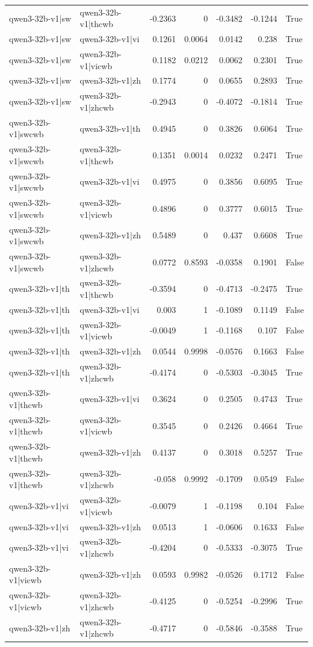 \begin{table}
\begin{tabular}{l l r r r r l}
qwen3-32b-v1|sw & qwen3-32b-v1|thcwb & -0.2363 & 0 & -0.3482 & -0.1244 & True \\
qwen3-32b-v1|sw & qwen3-32b-v1|vi & 0.1261 & 0.0064 & 0.0142 & 0.238 & True \\
qwen3-32b-v1|sw & qwen3-32b-v1|vicwb & 0.1182 & 0.0212 & 0.0062 & 0.2301 & True \\
qwen3-32b-v1|sw & qwen3-32b-v1|zh & 0.1774 & 0 & 0.0655 & 0.2893 & True \\
qwen3-32b-v1|sw & qwen3-32b-v1|zhcwb & -0.2943 & 0 & -0.4072 & -0.1814 & True \\
qwen3-32b-v1|swcwb & qwen3-32b-v1|th & 0.4945 & 0 & 0.3826 & 0.6064 & True \\
qwen3-32b-v1|swcwb & qwen3-32b-v1|thcwb & 0.1351 & 0.0014 & 0.0232 & 0.2471 & True \\
qwen3-32b-v1|swcwb & qwen3-32b-v1|vi & 0.4975 & 0 & 0.3856 & 0.6095 & True \\
qwen3-32b-v1|swcwb & qwen3-32b-v1|vicwb & 0.4896 & 0 & 0.3777 & 0.6015 & True \\
qwen3-32b-v1|swcwb & qwen3-32b-v1|zh & 0.5489 & 0 & 0.437 & 0.6608 & True \\
qwen3-32b-v1|swcwb & qwen3-32b-v1|zhcwb & 0.0772 & 0.8593 & -0.0358 & 0.1901 & False \\
qwen3-32b-v1|th & qwen3-32b-v1|thcwb & -0.3594 & 0 & -0.4713 & -0.2475 & True \\
qwen3-32b-v1|th & qwen3-32b-v1|vi & 0.003 & 1 & -0.1089 & 0.1149 & False \\
qwen3-32b-v1|th & qwen3-32b-v1|vicwb & -0.0049 & 1 & -0.1168 & 0.107 & False \\
qwen3-32b-v1|th & qwen3-32b-v1|zh & 0.0544 & 0.9998 & -0.0576 & 0.1663 & False \\
qwen3-32b-v1|th & qwen3-32b-v1|zhcwb & -0.4174 & 0 & -0.5303 & -0.3045 & True \\
qwen3-32b-v1|thcwb & qwen3-32b-v1|vi & 0.3624 & 0 & 0.2505 & 0.4743 & True \\
qwen3-32b-v1|thcwb & qwen3-32b-v1|vicwb & 0.3545 & 0 & 0.2426 & 0.4664 & True \\
qwen3-32b-v1|thcwb & qwen3-32b-v1|zh & 0.4137 & 0 & 0.3018 & 0.5257 & True \\
qwen3-32b-v1|thcwb & qwen3-32b-v1|zhcwb & -0.058 & 0.9992 & -0.1709 & 0.0549 & False \\
qwen3-32b-v1|vi & qwen3-32b-v1|vicwb & -0.0079 & 1 & -0.1198 & 0.104 & False \\
qwen3-32b-v1|vi & qwen3-32b-v1|zh & 0.0513 & 1 & -0.0606 & 0.1633 & False \\
qwen3-32b-v1|vi & qwen3-32b-v1|zhcwb & -0.4204 & 0 & -0.5333 & -0.3075 & True \\
qwen3-32b-v1|vicwb & qwen3-32b-v1|zh & 0.0593 & 0.9982 & -0.0526 & 0.1712 & False \\
qwen3-32b-v1|vicwb & qwen3-32b-v1|zhcwb & -0.4125 & 0 & -0.5254 & -0.2996 & True \\
qwen3-32b-v1|zh & qwen3-32b-v1|zhcwb & -0.4717 & 0 & -0.5846 & -0.3588 & True \\
\bottomrule
\end{tabular}
\end{table}
